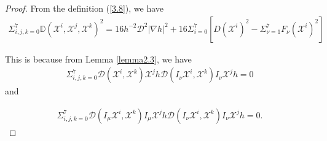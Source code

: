 \documentclass[reqno,12pt]{amsart}
\numberwithin{equation}{section}
\theoremstyle{plain}
\theoremstyle{definition}
\begin{document}
\begin{proof}
   

From the definition (\ref{3.8}), we have
\begin{align}\label{*}
    \Sigma_{i,j,k=0}^7\mathbb{D}(\mathscr{X}^i,\mathscr{X}^j,\mathscr{X}^k)^2=16h^{-2}\mathcal{D}^2|\nabla h|^2+16\Sigma_{i=0}^7[D(\mathscr{X}^i)^2-\Sigma_{\nu=1}^7F_\nu(\mathscr{X}^i)^2]
\end{align}

This is because from Lemma \ref{lemma2.3}, we have
\begin{align*}
    \Sigma_{i,j,k=0}^7 \mathcal{D}(\mathscr{X}^i,\mathscr{X}^k)\mathscr{X}^j h\mathcal{D}(I_\nu\mathscr{X}^i,\mathscr{X}^k)I_\nu\mathscr{X}^j h=0\end{align*}
and 

\begin{align*}
    \Sigma_{i,j,k=0}^7 \mathcal{D}(I_\mu\mathscr{X}^i,\mathscr{X}^k)I_\mu\mathscr{X}^j h\mathcal{D}(I_\nu\mathscr{X}^i,\mathscr{X}^k)I_\nu\mathscr{X}^j h=0.\end{align*}


\end{proof}
\end{document}
